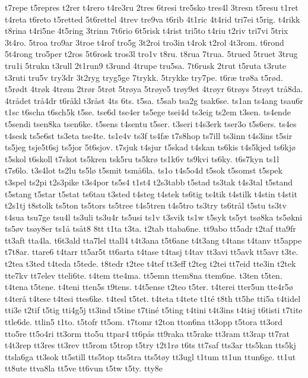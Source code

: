 {t7repe
t5repres
t2rer
t4rero
t4re3ru
2tres
6tresi
tre5sko
tres4l
3tresn
t5resu
t1ret
t4reta
t6reto
t5retted
5t6rettel
4trev
tre9va
t6rib
4t1ric
4t4rid
tri7ei
t5rig.
t4rikk
t8rina
t4ri5ne
4t5ring
3trinn
7t6rio
6t5risk
t4rist
tri5to
t4riu
t2riv
tri7vi
5trix
3t4ro.
5troa
tro9ar
3troe
t4rof
tro5g
3t2roi
tro3in
t4rok
t2rol
4t3rom.
t6rond
5t4rong
tro5per
t2ros
5t6rosk
tros3l
tro1v
t8ru.
t8rua
7trua.
5trued
5truet
3trug
tru1i
5trukn
t3rull
2t1run9
t3rund
4trupe
tru5sa.
7t6rusk
2trut
t5ruta
t3rute
t3ruti
tru5v
try3dr
3t2ryg
tryg5ge
7trykk.
5trykke
try7pe.
t6ræ
trø8a
t5rød.
t5rødt
4trøk
4trøm
2trør
5trøt
5trøya
5trøye5
trøy9et
4trøyr
6trøys
5trøyt
trå8da.
4trådet
trå4dr
t6råkl
t3råst
4ts
6ts.
t5sa.
t5sab
tsa2g
tsak6se.
ts1an
ts4ang
tsau6r
t1sc
t6scha
t6sch5k
t5se.
tse6d
tse4er
ts5ege
tsei4d
ts3eig
ts2em
t3sen.
ts4ende
t5sendi
tsen8ka
tsen6ke.
t5sens
t4sentu
t5ser.
t3seri
t4s3erk
tser3o
t5s6ers.
ts4es
t4sesk
ts5e6st
ts3eta
tse4te.
ts1e4v
ts3f
ts4fæ
t7s8hop
ts7ill
ts3inn
t4s3ins
t5sir
ts5jeg
tsje5t6sj
ts5jor
5t6sjov.
t7sjuk
t4sjur
t5skad
t4skan
ts6kis
t4s5kjed
ts6kjø
t5skol
t6skoll
t7skot
ts5kren
tsk5ru
ts5krø
ts1k6v
ts9kvi
ts6ky.
t6s7kyn
ts1l
t7s6lo.
t3s4lot
ts2lu
ts5lø
t5smit
tsmå6la.
ts1o
t4s5o4d
t5sok
t5somst
t5spek
t3spel
ts2pi
t2s3pike
t3s4por
ts5s4
t1st4
t2s3tabb
t5stad
ts3tak
t4s3tal
t5stand
t5stang
t5star
t5stat
ts6tau
t3sted
t4steg
t4stek
ts6tig
ts4tik
t4stilk
t4stin
t4stit
t2s1tj
t8stolk
ts5ton
ts5tors
ts5tree
t4s5tren
t4s5tro
ts3try
ts6trål
t5stu
ts3tv
t4sua
tsu7ge
tsu4l
ts3uli
ts3u4r
ts5usi
ts1v
t3svik
ts1w
t5syk
ts5yt
tsø8ka
ts5økni
ts5øv
tsøy8er
ts1å
tsåt8
8tt
t1ta
t3ta.
t2tab
ttaba6ne.
tt9abo
tt5adr
t2taf
tta9fr
tt3aft
tta4la.
t6t3ald
tta7lel
ttall4
t4t3ana
t5t6ane
t4t3ang
t4tans
t4tanv
tt5appe
t7t8ar.
ttare6
t4tarr
tt5ar5t
tt6arta
t4tase
t4tasj
t4tav
tt3avi
tt5avk
tt5avr
t3te.
t2tea
t3ted
t4teda
t5tede.
t8tedr
t2tee
t4tef
tt3eff
t2teg
t2tei
tt7eid
tte3in
t2tek
tte7kv
tt7elev
tteli6te.
t4tem
tte4ma.
tt5emn
ttem8na
ttem6ne.
t3ten
t5ten.
t4tena
t5tene.
t4teni
tten5s
t9tens.
t4t5ense
t2teo
t5ter.
t4terei
tter5un
tte4r5ø
t4terå
t4tese
t4tesi
ttes6ke.
t4tesl
t5tet.
t4teta
t4tete
t1té
t8th
tt5he
tti5a
t4tidel
tti3e
t2tif
t5tig
tti4g5j
tt3ind
t5tine
t7tiné
t5ting
t4tini
t4t3ins
t4tisj
t6tisti
t7tite
ttle6de.
ttlin5
t1to.
t5tofr
tt5om.
t7tomr
t2ton
tton6na
tt3opp
t5tora
tt3ord
tto5re
tt5o4ri
tt3orm
tto5u
ttpar4
tt6pås
tt9raka
tt5rake
tt3ram
tt3rap
tt7rat
t4t3rep
tt3res
tt3rev
tt5rom
t5trop
t5try
t2t1rø
t6ts
tt7saf
tts3ar
tts5kan
tts5kj
ttsla6ga
tt3sok
tt5still
tts5top
tts5tra
tts5tøy
tt3ugl
t1tum
tt1un
ttun6ge.
tt1ut
tt8ute
ttva8la
tt5ve
tt6vun
t5tw
t5ty.
tty8e
}
